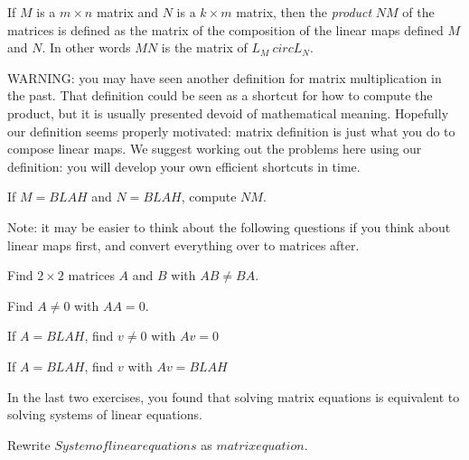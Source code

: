 	\begin{definition}
		If $M$ is a $m\times n$ matrix and $N$ is a $k \times m$ matrix, then the \textit{product} $NM$ of the matrices is
		defined as the matrix of the composition of the linear maps defined $M$ and $N$.  In other words  $MN$ is the matrix of 
		$L_M\ circ L_N$.
	\end{definition}
	
	WARNING:  you may have seen another definition for matrix multiplication in the past.  That definition could be seen as a shortcut for how
	to compute the product, but it is usually presented devoid of mathematical meaning.  Hopefully our definition seems properly motivated:  matrix definition is 
	just what you do to compose linear maps.  We suggest working out the problems here using our definition:  you will develop your own efficient shortcuts in time.
	
	\begin{question}
		If $M = BLAH$ and $N=BLAH$, compute $NM$.
	\end{question}
	
	Note:  it may be easier to think about the following questions if you think about linear maps first, and convert everything over to matrices after.
	
	\begin{question}
		Find $2\times 2$ matrices $A$ and $B$ with $AB \neq BA$.
	\end{question}
	
	\begin{question}
		Find $A \neq 0$  with $AA = 0$.
	\end{question}
	
	\begin{question}
		If $A = BLAH$, find $v \neq 0$ with $Av = 0$ 
	\end{question}
	
	\begin{question}
		If $A = BLAH$, find $v$ with $Av = BLAH$ 
	\end{question}
	
	In the last two exercises, you found that solving matrix equations is equivalent to solving systems of linear equations.
	
	\begin{question}
	Rewrite  $System of linear equations$ as $matrix equation$.
	\end{question}
	
